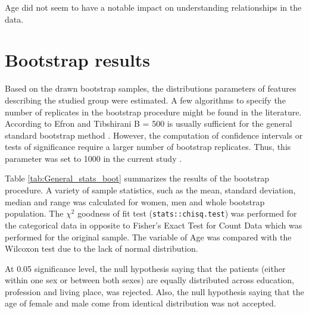 \documentclass[12pt,a4paper,notitlepage]{report}
\begin{document}
Age did not seem to have a notable impact on understanding relationships in the data.


\section{Bootstrap results}
Based on the drawn bootstrap samples, the distributions parameters of features describing the studied group were estimated. A few algorithms to specify the number of replicates in the bootstrap procedure might be found in the literature. According to Efron and Tibshirani  B = 500 is usually sufficient for the general standard bootstrap method \cite{Efron93}. However, the computation of confidence intervals or tests of significance require a larger number of bootstrap replicates. Thus, this parameter was set to 1000 in the current study \cite{Pattengale10, Davison97}.

Table \ref{tab:General_stats_boot} summarizes the results of the bootstrap procedure. 
A variety of sample statistics, such as the mean, standard deviation, median and range was calculated for women, men and whole bootstrap population.
The $\chi^2 $ goodness of fit test (\texttt{stats::chisq.test}) was performed for the categorical data in opposite to Fisher's Exact Test for Count Data which was performed for the original sample.
The variable of Age was compared with the Wilcoxon test due to the lack of normal distribution.

At 0.05 significance level, the null hypothesis saying that the patients (either within one sex or between both sexes) are equally distributed across education, profession and living place, was rejected. Also, the null hypothesis saying that the age of female and male come from identical distribution was not accepted.
\end{document}
